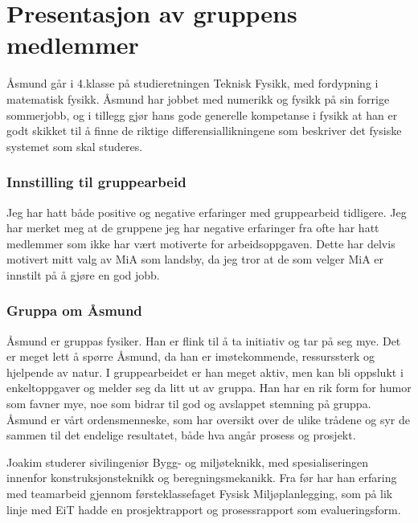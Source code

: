 \chapter{Presentasjon av gruppens medlemmer}
\fancyhead[LE]{\thepage\hspace{2em}\footnotesize{\leftmark}}
\fancyhead[RE,LO]{}
\fancyhead[RO]{{\footnotesize\leftmark}\hspace{2em}\thepage}

Åsmund går i 4.klasse på studieretningen Teknisk Fysikk, med fordypning 
i matematisk fysikk. Åsmund har jobbet med numerikk og fysikk på sin forrige 
sommerjobb, og i tillegg gjør hans gode generelle kompetanse i fysikk at han 
er godt skikket til å finne de riktige differensiallikningene som beskriver
det fysiske systemet som skal studeres.

\subsection*{Innstilling til gruppearbeid}
Jeg har hatt både positive og negative erfaringer med gruppearbeid tidligere.
Jeg har merket meg at de gruppene jeg har negative erfaringer fra ofte har hatt
medlemmer som ikke har vært motiverte for arbeidsoppgaven. Dette har delvis
motivert mitt valg av MiA som landsby, da jeg tror at de som velger MiA er
innstilt på å gjøre en god jobb.

\subsection*{Gruppa om Åsmund}

Åsmund er gruppas fysiker. Han er flink til å ta initiativ og tar på seg mye.
Det er meget lett å spørre Åsmund, da han er imøtekommende, ressurssterk og
hjelpende av natur. I gruppearbeidet er han meget aktiv, men kan bli oppslukt i enkeltoppgaver og
melder seg da litt ut av gruppa. Han har en rik form for humor som favner
mye, noe som bidrar til god og avslappet stemning på gruppa. Åsmund er vårt
ordensmenneske, som har oversikt over de ulike trådene og syr de sammen til det
endelige resultatet, både hva angår prosess og prosjekt.

Joakim studerer sivilingeniør Bygg- og miljøteknikk, med
spesialiseringen innenfor konstruksjonsteknikk og beregningsmekanikk. Fra før
har han erfaring med teamarbeid gjennom førsteklassefaget Fysisk
Miljøplanlegging, som på lik linje med EiT hadde en prosjektrapport og
prosessrapport som evalueringsform.

